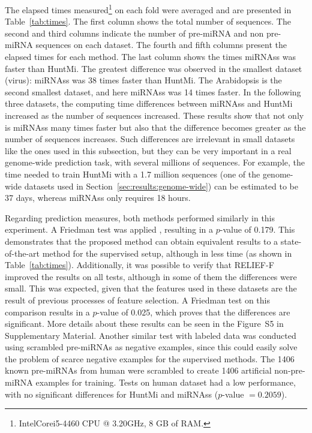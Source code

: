 \documentclass{article}
\begin{document}
The elapsed times measured\footnote{Intel\textregistered Core\texttrademark i5-4460 CPU @ 3.20GHz, 8 GB of RAM.} on each fold were averaged and are presented in Table~\ref{tab:times}. The first column shows the total number of sequences. The second and third columns indicate the number of pre-miRNA and non pre-miRNA sequences on each dataset. The fourth and fifth columns present the elapsed times for each method. The last column shows the times miRNAss was faster than HuntMi. The greatest difference was observed in the smallest dataset (virus): miRNAss was 38 times faster than HuntMi. The Arabidopsis is the second smallest dataset, and here miRNAss was 14 times faster. In the following three datasets, the computing time differences between miRNAss and HuntMi increased as the number of sequences increased. These results show that not only is miRNAss many times faster but also that the difference becomes greater as the number of sequences increases. Such differences are irrelevant in small datasets like the ones used in this subsection, but they can be very important in a real genome-wide prediction task, with several millions of sequences. For example, the time needed to train HuntMi with a 1.7 million sequences (one of the genome-wide datasets used in Section~\ref{sec:results:genome-wide}) can be estimated to be 37 days, whereas miRNAss only requires 18 hours.

Regarding prediction measures, both methods performed similarly in this experiment. A Friedman test was applied \citep{friedman1937use}, resulting in a $p$-value of 0.179. This demonstrates that the proposed method can obtain equivalent results to a state-of-the-art method for the supervised setup, although in less time (as shown in Table~\ref{tab:times}).
Additionally, it was possible to verify that RELIEF-F improved the results on all tests, although in some of them the differences were small. This was expected, given that the features used in these datasets are the result of previous processes of feature selection. A Friedman test on this comparison results in a $p$-value of 0.025, which proves that the differences are significant. More details about these results can be seen in the Figure~S5 in Supplementary Material.
Another similar test with labeled data was conducted using scrambled pre-miRNAs as negative examples, since this could easily solve the problem of scarce negative examples for the supervised methods. The 1406 known pre-miRNAs from human were scrambled to create 1406 artificial non-pre-miRNA examples for training. Tests on human dataset had a low performance, with no significant differences for HuntMi and miRNAss ($p$-value $= 0.2059$).
\end{document}
